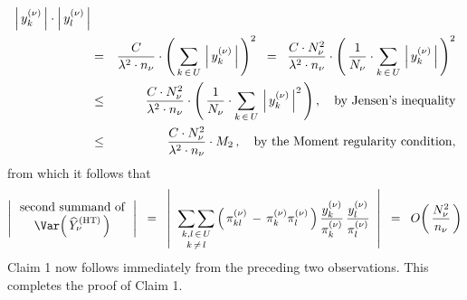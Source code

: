 \begin{eqnarray*}
    \left\vert\,y^{(\nu)}_{k}\,\right\vert
    \cdot
    \left\vert\,y^{(\nu)}_{l}\,\right\vert
\\
& = &
    \dfrac{C}{\lambda^{2} \cdot n_{\nu}}
    \cdot
    \left(\,
        \underset{k\,\in\,U}{\sum}\,
        \left\vert\,y^{(\nu)}_{k}\,\right\vert
        \,\right)^{2}
\;\; = \;\;
    \dfrac{C \cdot N_{\nu}^{2}}{\lambda^{2} \cdot n_{\nu}}
    \cdot
    \left(\,
        \dfrac{1}{N_{\nu}}
        \cdot
        \underset{k\,\in\,U}{\sum}\,
        \left\vert\,y^{(\nu)}_{k}\,\right\vert
        \,\right)^{2}
\\
& \leq &
    \dfrac{C \cdot N_{\nu}^{2}}{\lambda^{2} \cdot n_{\nu}}
    \cdot
    \left(\,
        \dfrac{1}{N_{\nu}}
        \cdot
        \underset{k\,\in\,U}{\sum}\,
        \left\vert\,y^{(\nu)}_{k}\,\right\vert^{2}
        \,\right),
    \quad
    \textnormal{by Jensen's inequality}
\\
& \leq &
    \dfrac{C \cdot N_{\nu}^{2}}{\lambda^{2} \cdot n_{\nu}}
    \cdot
    M_{2}\,,
    \quad
    \textnormal{by the Moment regularity condition},
\end{eqnarray*}
from which it follows that
\begin{equation*}
\left\vert\,\begin{array}{c}
    \textnormal{second summand of}
    \\
    \Var\!\left(\,\widehat{Y}^{\textnormal{(HT)}}_{\nu}\,\right)
    \end{array}\,\right\vert
\;\; = \;\;
    \left\vert\;\;
        \underset{k\,\neq\,l}{\underset{k,l\,\in\,U}{\sum\sum}}
        \left(\,
            \pi^{(\nu)}_{kl}
            \, - \,
            \pi^{(\nu)}_{k}\pi^{(\nu)}_{l}
            \,\right)
        \dfrac{y^{(\nu)}_{k}}{\pi^{(\nu)}_{k}}
        \,
        \dfrac{y^{(\nu)}_{l}}{\pi^{(\nu)}_{l}}
        \;\;\right\vert
\;\; = \;\;
    O\!\left(\,
        \dfrac{N_{\nu}^{2}}{n_{\nu}}
        \,\right)
\end{equation*}
Claim 1 now follows immediately from the preceding two observations.
This completes the proof of Claim 1.

